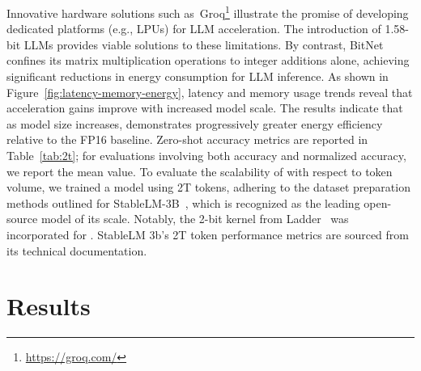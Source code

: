 Innovative hardware solutions such as~Groq\footnote{\url{https://groq.com/}} illustrate the promise of developing dedicated platforms (e.g., LPUs) for LLM acceleration. The introduction of 1.58-bit LLMs provides viable solutions to these limitations. By contrast, BitNet confines its matrix multiplication operations to integer additions alone, achieving significant reductions in energy consumption for LLM inference. As shown in Figure~\ref{fig:latency-memory-energy}, latency and memory usage trends reveal that acceleration gains improve with increased model scale. The results indicate that as model size increases,  demonstrates progressively greater energy efficiency relative to the FP16  baseline. Zero-shot accuracy metrics are reported in Table~\ref{tab:2t}; for evaluations involving both accuracy and normalized accuracy, we report the mean value. To evaluate the scalability of  with respect to token volume, we trained a  model using 2T tokens, adhering to the dataset preparation methods outlined for StableLM-3B~\cite{StableLM-3B-4E1T}, which is recognized as the leading open-source model of its scale. Notably, the 2-bit kernel from Ladder~\cite{ladder} was incorporated for . StableLM 3b's 2T token performance metrics are sourced from its technical documentation. \section{Results}

